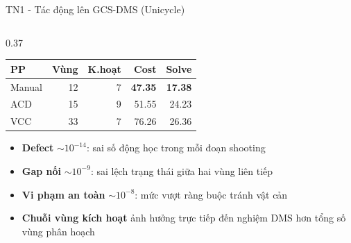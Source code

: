 \documentclass[aspectratio=169]{beamer}
\begin{document}
\begin{frame}{TN1 - Tác động lên GCS-DMS (Unicycle)}
\begin{columns}[T,onlytextwidth]
\begin{column}{0.37\textwidth}
            \begin{tabular}{@{}lrrrr@{}}
                \toprule
                \textbf{PP} & \textbf{Vùng} & \textbf{K.hoạt} & \textbf{Cost}  & \textbf{Solve} \\
                \midrule
                Manual      & 12            & 7               & \textbf{47.35} & \textbf{17.38} \\
                ACD         & 15            & 9               & 51.55          & 24.23          \\
                VCC         & 33            & 7               & 76.26          & 26.36          \\
                \bottomrule
            \end{tabular}

            \vspace{0.3em}
            \footnotesize
            \begin{itemize}
                \setlength\itemsep{0.12em}
                \item \textbf{Defect} $\sim 10^{-14}$: sai số động học trong mỗi đoạn shooting
                \item \textbf{Gap nối} $\sim 10^{-9}$: sai lệch trạng thái giữa hai vùng liên tiếp
                \item \textbf{Vi phạm an toàn} $\sim 10^{-8}$: mức vượt ràng buộc tránh vật cản
                \item \textbf{Chuỗi vùng kích hoạt} ảnh hưởng trực tiếp đến nghiệm DMS hơn tổng số vùng phân hoạch
            \end{itemize}

        \end{column}

    \end{columns}
\end{frame}
\end{document}
